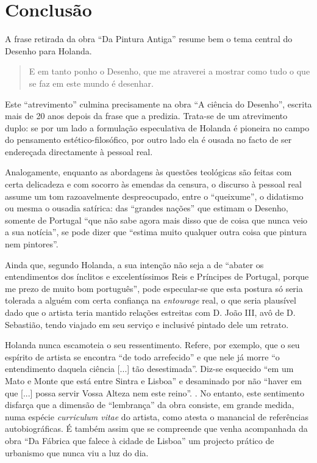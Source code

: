 \documentclass{article}
\begin{document}
\section{Conclusão}

A frase retirada da obra ``Da Pintura Antiga'' resume bem o tema
central do Desenho para Holanda. \cite{holanda-pintura}

\begin{quote}
  E em tanto ponho o Desenho, que me atraverei a mostrar como tudo o
  que se faz em este mundo é desenhar.
\end{quote}

Este ``atrevimento'' culmina precisamente na obra ``A ciência do
Desenho'', escrita mais de 20 anos depois da frase que a
predizia. Trata-se de um atrevimento duplo: se por um lado a
formulação especulativa de Holanda é pioneira no campo do pensamento
estético-filosófico, por outro lado ela é ousada no facto de ser
endereçada directamente à pessoal real.

Analogamente, enquanto as abordagens às questões teológicas são feitas
com certa delicadeza e com socorro às emendas da censura, o discurso à
pessoal real assume um tom razoavelmente despreocupado, entre o
``queixume'', o didatismo ou mesma o ousadia satírica: das ``grandes
nações'' que estimam o Desenho, somente de Portugal ``que não sabe
agora mais disso que de coisa que nunca veio a sua notícia'', se pode
dizer que ``estima muito qualquer outra coisa que pintura nem
pintores''.

Ainda que, segundo Holanda, a sua intenção não seja a de ``abater os
entendimentos dos ínclitos e excelentíssimos Reis e Príncipes de
Portugal, porque me prezo de muito bom português'', pode especular-se
que esta postura só seria tolerada a alguém com certa confiança na
\emph{entourage} real, o que seria plausível dado que o artista teria
mantido relações estreitas com D. João III, avô de D. Sebastião, tendo
viajado em seu serviço e inclusivé pintado dele um retrato.

Holanda nunca escamoteia o seu ressentimento. Refere, por exemplo, que
o seu espírito de artista se encontra ``de todo arrefecido'' e que
nele já morre ``o entendimento daquela ciência [...] tão
desestimada''. Diz-se esquecido ``em um Mato e Monte que está entre
Sintra e Lisboa'' e desaminado por não ``haver em que [...]  possa
servir Vossa Alteza nem este reino''. \cite[fl.48r]{holanda}. No
entanto, este sentimento disfarça que a dimensão de ``lembrança'' da
obra consiste, em grande medida, numa espécie \emph{curriculum vitae}
do artista, como atesta o manancial de referências autobiográficas. É
também assim que se compreende que venha acompanhada da obra ``Da
Fábrica que falece à cidade de Lisboa'' um projecto prático de
urbanismo que nunca viu a luz do dia.
\end{document}
